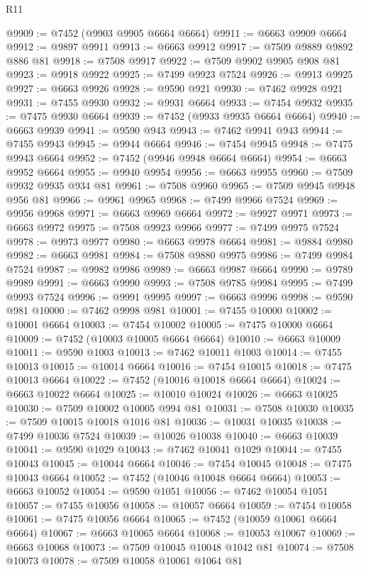 \begin{lexlean}{R11}
\begin{coremodule}
@9909 := @7452 (@9903 @9905 @6664 @6664)
@9911 := @6663 @9909 @6664
@9912 := @9897 @9911
@9913 := @6663 @9912
@9917 := @7509 @9889 @9892 @886 @81
@9918 := @7508 @9917
@9922 := @7509 @9902 @9905 @908 @81
@9923 := @9918 @9922
@9925 := @7499 @9923 @7524
@9926 := @9913 @9925
@9927 := @6663 @9926
@9928 := @9590 @921
@9930 := @7462 @9928 @921
@9931 := @7455 @9930
@9932 := @9931 @6664
@9933 := @7454 @9932
@9935 := @7475 @9930 @6664
@9939 := @7452 (@9933 @9935 @6664 @6664)
@9940 := @6663 @9939
@9941 := @9590 @943
@9943 := @7462 @9941 @943
@9944 := @7455 @9943
@9945 := @9944 @6664
@9946 := @7454 @9945
@9948 := @7475 @9943 @6664
@9952 := @7452 (@9946 @9948 @6664 @6664)
@9954 := @6663 @9952 @6664
@9955 := @9940 @9954
@9956 := @6663 @9955
@9960 := @7509 @9932 @9935 @934 @81
@9961 := @7508 @9960
@9965 := @7509 @9945 @9948 @956 @81
@9966 := @9961 @9965
@9968 := @7499 @9966 @7524
@9969 := @9956 @9968
@9971 := @6663 @9969 @6664
@9972 := @9927 @9971
@9973 := @6663 @9972
@9975 := @7508 @9923 @9966
@9977 := @7499 @9975 @7524
@9978 := @9973 @9977
@9980 := @6663 @9978 @6664
@9981 := @9884 @9980
@9982 := @6663 @9981
@9984 := @7508 @9880 @9975
@9986 := @7499 @9984 @7524
@9987 := @9982 @9986
@9989 := @6663 @9987 @6664
@9990 := @9789 @9989
@9991 := @6663 @9990
@9993 := @7508 @9785 @9984
@9995 := @7499 @9993 @7524
@9996 := @9991 @9995
@9997 := @6663 @9996
@9998 := @9590 @981
@10000 := @7462 @9998 @981
@10001 := @7455 @10000
@10002 := @10001 @6664
@10003 := @7454 @10002
@10005 := @7475 @10000 @6664
@10009 := @7452 (@10003 @10005 @6664 @6664)
@10010 := @6663 @10009
@10011 := @9590 @1003
@10013 := @7462 @10011 @1003
@10014 := @7455 @10013
@10015 := @10014 @6664
@10016 := @7454 @10015
@10018 := @7475 @10013 @6664
@10022 := @7452 (@10016 @10018 @6664 @6664)
@10024 := @6663 @10022 @6664
@10025 := @10010 @10024
@10026 := @6663 @10025
@10030 := @7509 @10002 @10005 @994 @81
@10031 := @7508 @10030
@10035 := @7509 @10015 @10018 @1016 @81
@10036 := @10031 @10035
@10038 := @7499 @10036 @7524
@10039 := @10026 @10038
@10040 := @6663 @10039
@10041 := @9590 @1029
@10043 := @7462 @10041 @1029
@10044 := @7455 @10043
@10045 := @10044 @6664
@10046 := @7454 @10045
@10048 := @7475 @10043 @6664
@10052 := @7452 (@10046 @10048 @6664 @6664)
@10053 := @6663 @10052
@10054 := @9590 @1051
@10056 := @7462 @10054 @1051
@10057 := @7455 @10056
@10058 := @10057 @6664
@10059 := @7454 @10058
@10061 := @7475 @10056 @6664
@10065 := @7452 (@10059 @10061 @6664 @6664)
@10067 := @6663 @10065 @6664
@10068 := @10053 @10067
@10069 := @6663 @10068
@10073 := @7509 @10045 @10048 @1042 @81
@10074 := @7508 @10073
@10078 := @7509 @10058 @10061 @1064 @81

\end{coremodule}
\end{lexlean}
